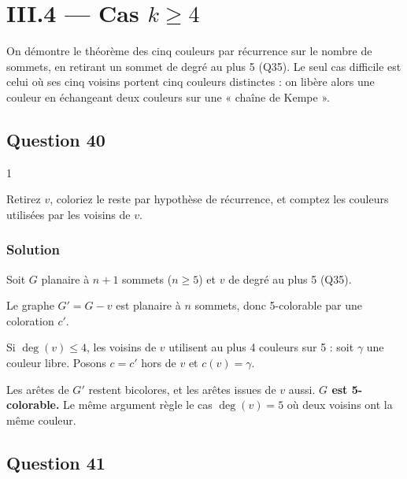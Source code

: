 \documentclass[11pt,a4paper]{article}
\begin{document}
\hypertarget{iii.4-cas-k-geqslant-4}{%
\section{\texorpdfstring{III.4 --- Cas \(k \geqslant 4\)}{III.4 --- Cas k \textbackslash geqslant 4}}\label{iii.4-cas-k-geqslant-4}}

On démontre le théorème des cinq couleurs par récurrence sur le nombre de sommets, en retirant un sommet de degré au plus 5 (Q35). Le seul cas difficile est celui où ses cinq voisins portent cinq couleurs distinctes : on libère alors une couleur en échangeant deux couleurs sur une « chaîne de Kempe ».

\hypertarget{question-40}{%
\subsection{Question 40}\label{question-40}}

\begin{indication}{1}

Retirez \(v\), coloriez le reste par hypothèse de récurrence, et comptez les couleurs utilisées par les voisins de \(v\).

\end{indication}

\hypertarget{solution-39}{%
\subsubsection{Solution}\label{solution-39}}

Soit \(G\) planaire à \(n + 1\) sommets (\(n \ge 5\)) et \(v\) de degré au plus 5 (Q35).

Le graphe \(G' = G - v\) est planaire à \(n\) sommets, donc 5-colorable par une coloration \(c'\).

Si \(\deg(v) \le 4\), les voisins de \(v\) utilisent au plus 4 couleurs sur 5 : soit \(\gamma\) une couleur libre. Posons \(c = c'\) hors de \(v\) et \(c(v) = \gamma\).

Les arêtes de \(G'\) restent bicolores, et les arêtes issues de \(v\) aussi. \textbf{\(G\) est 5-colorable.} Le même argument règle le cas \(\deg(v) = 5\) où deux voisins ont la même couleur.

\hypertarget{question-41}{%
\subsection{Question 41}\label{question-41}}
\end{document}
